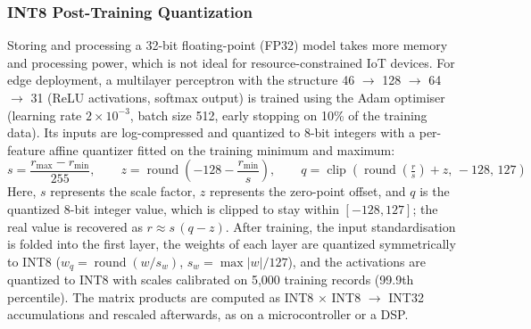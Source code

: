 \documentclass[]{interact}
\theoremstyle{plain}%
\theoremstyle{definition}
\theoremstyle{remark}
\begin{document}
\subsubsection{INT8 Post-Training Quantization}
Storing and processing a 32-bit floating-point (FP32) model takes more memory and processing power, which is not ideal for resource-constrained IoT devices. For edge deployment, a multilayer perceptron with the structure 46 $\rightarrow$ 128 $\rightarrow$ 64 $\rightarrow$ 31 (ReLU activations, softmax output) is trained using the Adam optimiser (learning rate $2\times10^{-3}$, batch size 512, early stopping on 10\% of the training data). Its inputs are log-compressed and quantized to 8-bit integers with a per-feature affine quantizer fitted on the training minimum and maximum:
\begin{equation}
  s = \frac{r_{\max}-r_{\min}}{255}, \qquad
  z = \operatorname{round}\!\left(-128 - \frac{r_{\min}}{s}\right), \qquad
  q = \operatorname{clip}\!\left(\operatorname{round}\!\left(\tfrac{r}{s}\right) + z,\,-128,\,127\right)
\end{equation}
Here, $s$ represents the scale factor, $z$ represents the zero-point offset, and $q$ is the quantized 8-bit integer value, which is clipped to stay within $[-128, 127]$; the real value is recovered as $r \approx s\,(q - z)$. After training, the input standardisation is folded into the first layer, the weights of each layer are quantized symmetrically to INT8 ($w_q = \operatorname{round}(w / s_w)$, $s_w = \max|w| / 127$), and the activations are quantized to INT8 with scales calibrated on 5,000 training records (99.9th percentile). The matrix products are computed as INT8 $\times$ INT8 $\rightarrow$ INT32 accumulations and rescaled afterwards, as on a microcontroller or a DSP.
\end{document}
